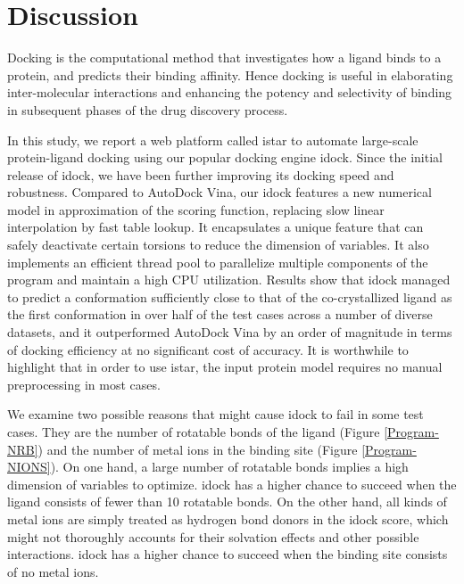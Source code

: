 \section{Discussion}

Docking is the computational method that investigates how a ligand binds to a protein, and predicts their binding affinity. Hence docking is useful in elaborating inter-molecular interactions and enhancing the potency and selectivity of binding in subsequent phases of the drug discovery process.

In this study, we report a web platform called istar to automate large-scale protein-ligand docking using our popular docking engine idock. Since the initial release of idock, we have been further improving its docking speed and robustness. Compared to AutoDock Vina, our idock features a new numerical model in approximation of the scoring function, replacing slow linear interpolation by fast table lookup. It encapsulates a unique feature that can safely deactivate certain torsions to reduce the dimension of variables. It also implements an efficient thread pool to parallelize multiple components of the program and maintain a high CPU utilization. Results show that idock managed to predict a conformation sufficiently close to that of the co-crystallized ligand as the first conformation in over half of the test cases across a number of diverse datasets, and it outperformed AutoDock Vina by an order of magnitude in terms of docking efficiency at no significant cost of accuracy. It is worthwhile to highlight that in order to use istar, the input protein model requires no manual preprocessing in most cases.

We examine two possible reasons that might cause idock to fail in some test cases. They are the number of rotatable bonds of the ligand (Figure \ref{Program-NRB}) and the number of metal ions in the binding site (Figure \ref{Program-NIONS}). On one hand, a large number of rotatable bonds implies a high dimension of variables to optimize. idock has a higher chance to succeed when the ligand consists of fewer than 10 rotatable bonds. On the other hand, all kinds of metal ions are simply treated as hydrogen bond donors in the idock score, which might not thoroughly accounts for their solvation effects and other possible interactions. idock has a higher chance to succeed when the binding site consists of no metal ions.

